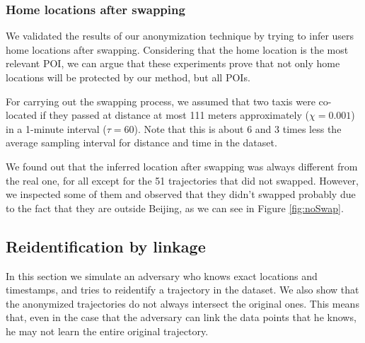 \documentclass[]{llncs}
\begin{document}
%
\subsubsection{Home locations after swapping}
We validated the results of our anonymization technique by trying to infer users home locations after swapping. 
Considering that the home location is the most relevant POI, we can argue that these experiments prove that not only home locations will be protected by our method, but all POIs.

For carrying out the swapping process, we assumed that two taxis were co-located if they passed at distance at most 111 meters approximately ($\chi= 0.001$) in a 1-minute interval ($\tau = 60$). Note that this is about 6 and 3 times less the average sampling interval for distance and time in the dataset.

We found out that the inferred location after swapping was always different from the real one, for all except for the 51 trajectories that did not swapped.
However, we inspected some of them and observed that they didn't swapped probably due to the fact that they are outside Beijing, as we can see in Figure \ref{fig:noSwap}.


\subsection{Reidentification by linkage}

In this section we simulate an adversary who knows exact locations and timestamps, and tries to reidentify a trajectory in the dataset.
We also show that the anonymized trajectories do not always intersect the original ones. This means that, even in the case that the adversary can link the data points that he knows, he may not learn the entire original trajectory. 
\end{document}
